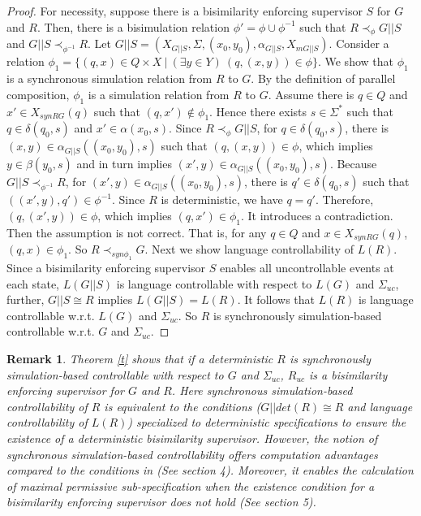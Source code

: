 \documentclass[preprint,authoryear,12pt]{elsarticle}
\newtheorem{Remark}{Remark}
\begin{document}
\begin{proof}
For necessity, suppose there is a bisimilarity enforcing
supervisor $S$ for $G$ and $R$. Then, there is a bisimulation
relation $\phi'=\phi \cup \phi^{-1}$ such that $R \prec_{\phi}
G||S$ and $G||S \prec_{\phi^{-1}} R$. Let $G||S=(X_{G||S}, \Sigma,
(x_0, y_0), \alpha_{G||S},X_{mG||S})$. Consider a relation
$\phi_1=\{(q, x) \in Q \times X ~|~(\exists y \in Y)~(q, (x, y))
\in \phi \}$. We show that $\phi_1$ is a synchronous simulation
relation from $R$ to $G$. By the definition of parallel
composition, $\phi_1$ is a simulation relation from $R$ to $G$.
Assume there is $q \in Q$ and $x' \in X_{synRG}(q)$ such that $(q,
x') \notin \phi_1$. Hence there exists $s \in \Sigma^{*}$ such
that $q \in \delta(q_0, s)$ and $x' \in \alpha(x_0, s)$. Since $R
\prec_{\phi} G||S$, for $q \in \delta(q_0, s)$, there is $(x, y)
\in \alpha_{G||S}((x_0, y_0), s)$ such that $(q, (x, y)) \in
\phi$, which implies $y \in \beta(y_0, s)$ and in turn implies
$(x', y) \in \alpha_{G||S}((x_0, y_0),s)$. Because $G||S
\prec_{\phi^{-1}} R$, for $(x', y) \in \alpha_{G||S}((x_0,
y_0),s)$, there is $q' \in \delta(q_0, s)$ such that $((x', y),
q') \in \phi^{-1}$. Since $R$ is deterministic, we have $q=q'$.
Therefore, $(q, (x', y)) \in \phi$, which implies $(q, x') \in
\phi_1$. It introduces a contradiction. Then the assumption is not
correct. That is, for any $q \in Q$ and $x \in X_{synRG}(q)$, $(q,
x) \in \phi_1$. So $R \prec_{syn\phi_1} G$. Next we show language
controllability of $L(R)$. Since a bisimilarity enforcing
supervisor $S$ enables all uncontrollable events at each state,
$L(G||S)$ is language controllable with respect to $L(G)$ and
$\Sigma_{uc}$, further, $G||S \cong R$ implies $L(G||S)=L(R)$. It
follows that $L(R)$ is language controllable w.r.t. $L(G)$ and
$\Sigma_{uc}$. So $R$ is synchronously simulation-based
controllable w.r.t. $G$ and $\Sigma_{uc}$.
\end{proof}


\begin{Remark}
Theorem \ref{t} shows that if a deterministic $R$ is synchronously
simulation-based controllable with respect to $G$ and
$\Sigma_{uc}$, $R_{uc}$ is a bisimilarity enforcing supervisor for
$G$ and $R$. Here synchronous simulation-based controllability of
$R$ is equivalent to the conditions ($G||det(R)\cong R$ and
language controllability of $L(R)$) specialized to deterministic
specifications \citep{zhoubisimilarity2011} to ensure the
existence of a deterministic bisimilarity supervisor. However, the
notion of synchronous simulation-based controllability offers
computation advantages compared to the conditions in
\citep{zhoubisimilarity2011} (See section 4). Moreover, it enables
the calculation of maximal permissive sub-specification when the
existence condition for a bisimilarity enforcing supervisor does
not hold (See section 5).
\end{Remark}
\end{document}

